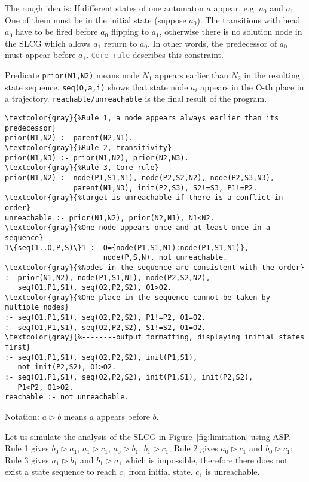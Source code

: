 The rough idea is: If different states of one automaton $a$ appear, e.g. $a_0$ and $a_1$.
One of them must be in the initial state (suppose $a_0$).
The transitions with head $a_0$ have to be fired before $a_0$ flipping to $a_1$, otherwise there is no solution node in the SLCG which allows $a_1$ return to $a_0$.
In other words, the predecessor of $a_0$ must appear before $a_1$. \texttt{\textcolor{gray}{Core rule}} describes this constraint.

Predicate \texttt{prior(N1,N2)} means node $N_1$ appears earlier than $N_2$ in the resulting state sequence.
\texttt{seq(O,a,i)} shows that state node $a_i$ appears in the O-th place in a trajectory.
\texttt{reachable/unreachable} is the final result of the program.

\begin{Verbatim}[commandchars=\\\{\}]
\textcolor{gray}{%Rule 1, a node appears always earlier than its predecessor}
prior(N1,N2) :- parent(N2,N1).
\textcolor{gray}{%Rule 2, transitivity}
prior(N1,N3) :- prior(N1,N2), prior(N2,N3).
\textcolor{gray}{%Rule 3, Core rule}
prior(N1,N2) :- node(P1,S1,N1), node(P2,S2,N2), node(P2,S3,N3), 
                parent(N1,N3), init(P2,S3), S2!=S3, P1!=P2. 
\textcolor{gray}{%target is unreachable if there is a conflict in order}
unreachable :- prior(N1,N2), prior(N2,N1), N1<N2.
\textcolor{gray}{%One node appears once and at least once in a sequence}
1\{seq(1..O,P,S)\}1 :- O={node(P1,S1,N1):node(P1,S1,N1)},
                       node(P,S,N), not unreachable.
\textcolor{gray}{%Nodes in the sequence are consistent with the order}
:- prior(N1,N2), node(P1,S1,N1), node(P2,S2,N2),
   seq(O1,P1,S1), seq(O2,P2,S2), O1>O2.
\textcolor{gray}{%One place in the sequence cannot be taken by multiple nodes}
:- seq(O1,P1,S1), seq(O2,P2,S2), P1!=P2, O1=O2.
:- seq(O1,P1,S1), seq(O2,P2,S2), S1!=S2, O1=O2.
\textcolor{gray}{%--------output formatting, displaying initial states first}
:- seq(O1,P1,S1), seq(O2,P2,S2), init(P1,S1),
   not init(P2,S2), O1>O2.
:- seq(O1,P1,S1), seq(O2,P2,S2), init(P1,S1), init(P2,S2),
   P1<P2, O1>O2.
reachable :- not unreachable.
\end{Verbatim}

Notation: $a\rhd b$ means $a$ appears before $b$.

\begin{example}
Let us simulate the analysis of the SLCG in Figure~\ref{fig:limitation} using ASP.
Rule 1 gives $b_0\rhd a_1$, $a_1\rhd c_1$, $a_0\rhd b_1$, $b_1\rhd c_1$; Rule 2 gives $a_0\rhd c_1$ and $b_0\rhd c_1$; Rule 3 gives $a_1\rhd b_1$ and $b_1\rhd a_1$ which is impossible, therefore there does not exist a state sequence to reach $c_1$ from initial state.
$c_1$ is unreachable.
\end{example}

